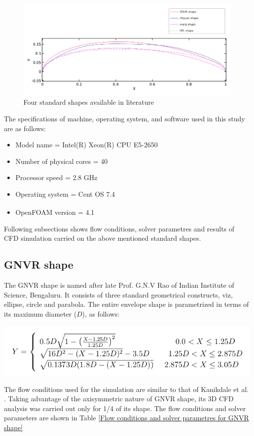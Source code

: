 \begin{figure}[H]
	\centering
	\includegraphics[width=400 pt]{rnd/all_profiles.png}
	\caption{Four standard shapes available in literature}
	\label{All profiles} 
\end{figure}
The specifications of machine, operating system, and software used in this study are as follows:
\begin{itemize}
	\item Model name = Intel(R) Xeon(R) CPU E5-2650
	\item Number of physical cores = 40
	\item Processor speed = 2.8 GHz
	\item Operating system = Cent OS 7.4
	\item OpenFOAM\textsuperscript{\textregistered} version = 4.1
\end{itemize}
Following subsections shows flow conditions, solver parametres and results of CFD simulation carried on the above mentioned standard shapes. 

\subsection{GNVR shape \cite{Ram2010}}
The GNVR shape \cite{Ram2010} is named after late Prof. G.N.V Rao of Indian Institute of Science, Bengaluru. It consists of three standard geometrical constructs, viz, ellipse, circle and parabola. The entire envelope shape is parametrized in terms of its maximum diameter ($D$), as follows:
\begin{center}
	\includegraphics[width= 200 pt]{rnd/GNVR_equations.png}
\end{center}



The flow conditions used for the simulation are similar to that of Kanikdale et al. \cite{kanikdale2004multi}. Taking advantage of the axisymmetric nature of GNVR shape, its 3D CFD analysis was carried out only for 1/4 of its shape. The flow conditions and solver parameters are shown in Table \ref{Flow conditions and solver parametres for GNVR shape}

